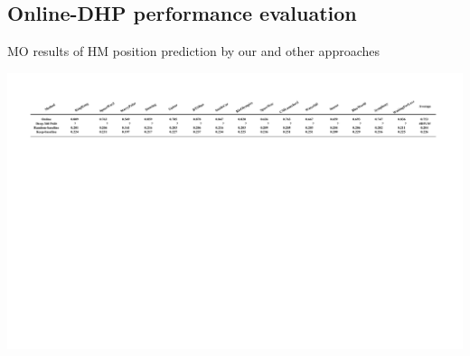\documentclass[10pt,journal,compsoc]{IEEEtran}
\begin{document}

\subsection{Online-DHP performance evaluation}
\label{online-compare}

\begin{table}
	\begin{center}
		\caption{MO results of HM position prediction by our and other approaches} \centerline{\includegraphics[width=2\columnwidth]{figures/experiment_on_line/Online_compare}}%
		\label{table-MeanMo}
	\end{center}
\end{table}
\end{document}
